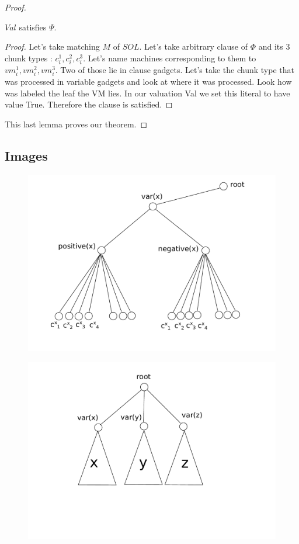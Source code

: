 \begin{proof}
\begin{lemma}$Val$ satisfies $\Psi$.
\end{lemma}
\begin{proof}
Let's take matching $M$ of $SOL$. Let's take arbitrary clause of
$\Phi$ and its $3$ chunk types 
: $c_i^1, c_i^2, c_i^3$. Let's name machines corresponding to them
to $vm_i^1, vm_i^2, vm_i^3$. Two of those lie in clause gadgets. Let's
take the chunk type that was processed in variable
gadgets and look at where it was processed. Look how was labeled the
leaf the VM lies. In our valuation Val we set this literal to have
value True. Therefore the clause is satisfied.
\end{proof}

This last lemma proves our theorem.
\end{proof}
\subsection{Images}

\begin{figure}[htbp]
\includegraphics[width = \columnwidth]{figs/gadget-no-bw.pdf}
\end{figure}


\begin{figure}[htbp]
\includegraphics[width = \columnwidth]{figs/vc-instance.pdf}
\end{figure}


